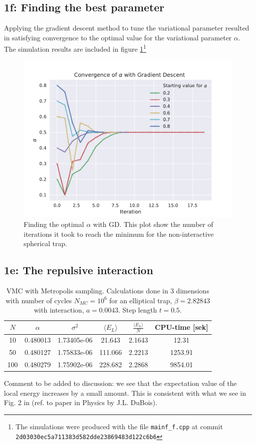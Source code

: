 \subsection*{\textbf{1f:} Finding the best parameter}
Applying the gradient descent method to tune the variational parameter resulted in satisfying convergence to the optimal value for the variational parameter $\alpha$. The simulation results are included in figure \ref{fig:gd_nm_nia}\footnote{The simulations were produced with the file \lstinline{mainf_f.cpp} at commit \lstinline{2d03030ec5a711383d582dde23869483d122c6b6}}


\begin{figure}
\includegraphics{figures/GD_NM_NIA.pdf}
\caption{Finding the optimal $\alpha$ with GD. This plot show the number of iterations it took to reach the minimum for the non-interactive spherical trap.}\label{fig:gd_nm_nia}
\end{figure} 

\subsection*{\textbf{1e:} The repulsive interaction}

\begin{table}[]
    \centering
    \begin{tabular}{|c|c|c|c|c|c|}
    \hline
         $N$ & $\alpha$ & $\sigma^2$ & $\langle E_L \rangle$ & $\frac{\langle E_L \rangle}{N}$ & CPU-time [sek] \\
         \hline
         10 & 0.480013 & 1.73405e-06 & 21.643 & 2.1643 & 12.31 \\
         \hline
         50 & 0.480127 & 1.75833e-06 & 111.066 & 2.2213 & 1253.91\\
         \hline
         100 & 0.480279 & 1.75902e-06 & 228.682 & 2.2868 & 9854.01 \\
         \hline
    \end{tabular}
    \caption{VMC with Metropolis sampling. Calculations done in 3 dimensions with number of cycles $N_{MC} = 10^{6}$ for an elliptical trap, $\beta = 2.82843$ with interaction, $a = 0.0043$. Step length $t = 0.5$.}
    \label{tab:Re.int.}
\end{table}

Comment to be added to discussion: we see that the expectation value of the local energy increases by a small amount. This is consistent with what we see in Fig. 2 in (ref. to paper in Physics by J.L. DuBois). 
